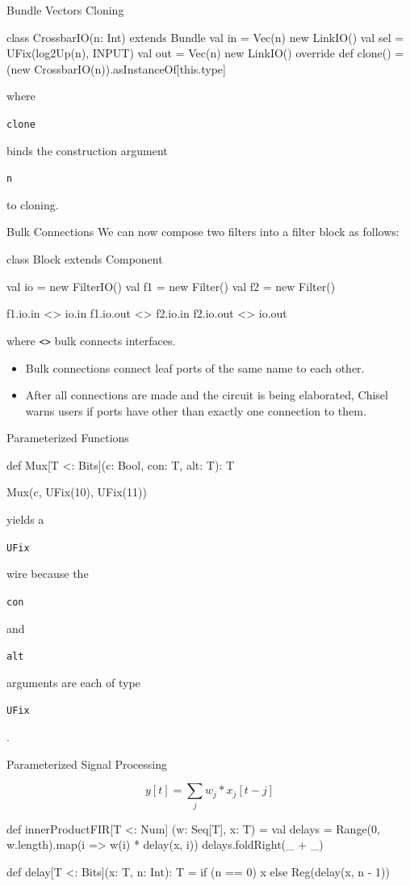 \documentclass[xcolor=pdflatex,dvipsnames,table]{beamer}
\newcommand{\code}[1]{\begin{footnotesize}{\tt #1}\end{footnotesize}}
\begin{document}
\begin{frame}[fragile]{Bundle Vectors Cloning}

\begin{scala}
class CrossbarIO(n: Int) extends Bundle {
  val in  = Vec(n){ new LinkIO() }
  val sel = UFix(log2Up(n), INPUT)
  val out = Vec(n){ new LinkIO() }
  override def clone() = (new CrossbarIO(n)).asInstanceOf[this.type]
}
\end{scala}

\noindent
where \code{clone} binds the construction argument \code{n} to cloning.

\end{frame}

\begin{frame}[fragile]{Bulk Connections}
We can now compose two filters into a filter block as follows:

\begin{scala}
class Block extends Component { 
  val io = new FilterIO()
  val f1 = new Filter()
  val f2 = new Filter()

  f1.io.in  <> io.in
  f1.io.out <> f2.io.in
  f2.io.out <> io.out
}
\end{scala}

\noindent
where \verb+<>+ bulk connects interfaces.
\begin{itemize}
\item Bulk connections connect leaf ports of the same name to each other.
\item After all connections are made and the circuit is being elaborated,
Chisel warns users if ports have other than exactly one connection to them.
\end{itemize}

\end{frame}

\begin{frame}[fragile]{Parameterized Functions}
\begin{scala}
def Mux[T <: Bits](c: Bool, con: T, alt: T): T

Mux(c, UFix(10), UFix(11))
\end{scala}

\noindent
yields a \code{UFix} wire because the \code{con} and \code{alt}
arguments are each of type \code{UFix}.
\end{frame}

\begin{frame}[fragile]{Parameterized Signal Processing}

\begin{equation}
y[t] = \sum_j w_j * x_j[t-j]
\end{equation}

\begin{scala}
def innerProductFIR[T <: Num] (w: Seq[T], x: T) = {
  val delays = Range(0, w.length).map(i => w(i) * delay(x, i))
  delays.foldRight(_ + _)
}

def delay[T <: Bits](x: T, n: Int): T =
  if (n == 0) x else Reg(delay(x, n - 1))
\end{scala}

\end{frame}
\end{document}
